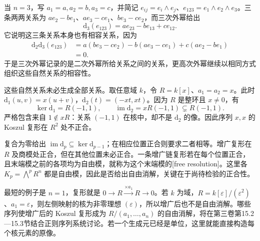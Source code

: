\ProseParagraphBreak
当 \(n=3\)，写 \(a_1=a,a_2=b,a_3=c\)，并简记 \(e_{ij}=e_i\wedge e_j\)、\(e_{123}=e_1\wedge e_2\wedge e_3\)。三条两两关系为 \(ae_2-be_1\)、\(ae_3-ce_1\)、\(be_3-ce_2\)，而三次外幂给出
\[
	\mathrm{d}_3(e_{123})=a e_{23}-b e_{13}+c e_{12}.
\]
它说明这三条关系本身也有相容关系，因为
\[
	\begin{aligned}
		\mathrm{d}_2\mathrm{d}_3(e_{123}) &=a(be_3-ce_2)-b(ae_3-ce_1)+c(ae_2-be_1)\\
		&=0.
	\end{aligned}
\]
于是三次外幂记录的是二次外幂所给关系之间的关系，更高次外幂继续以相同方式组织这些自然关系的相容性。

\ProseParagraphBreak
这些自然关系未必生成全部关系。取任意域 \(k\)，令 \(R=k[x]\)、\(a_1=a_2=x\)。此时 \(\mathrm{d}_1(u,v)=x(u+v)\)，\(\mathrm{d}_2(t)=(-xt,xt)\)。因为 \(R\) 是整环且 \(x\ne0\)，有
\[
	\ker\mathrm{d}_1=R(-1,1),\qquad \operatorname{im}\mathrm{d}_2=xR(-1,1)\subsetneq R(-1,1).
\]
严格包含来自 \(1\notin xR\)：关系 \((-1,1)\) 在核中，却不是 \(\mathrm{d}_2\) 的像。因此序列 \(x,x\) 的 Koszul 复形在 \(R^2\) 处不正合。

\ProseParagraphBreak
复合为零给出 \(\operatorname{im}\mathrm{d}_p\subseteq\ker\mathrm{d}_{p-1}\)；在相应位置正合则要求二者相等。增广复形在 \(R\) 及商模处正合，但在其他位置未必正合。一条增广链复形若在每个位置正合，且末端模之前的各项均为自由模，就称为这个末端模的[free resolution]。这里各 \(K_p=\bigwedge^pR^n\) 都是自由模，因此是否给出自由消解，关键在于尚待检验的正合性。

\ProseParagraphBreak
最短的例子是 \(n=1\)，复形就是 \(0\to R\xrightarrow{\times a_1}R\to0\)。若 \(k\) 为域，\(R=k[\varepsilon]/(\varepsilon^2)\)、\(a_1=\varepsilon\)，则左侧映射的核为非零理想 \((\varepsilon)\)，所以增广后也不是自由消解。哪些序列使增广后的 Koszul 复形成为 \(R/(a_1,\ldots,a_n)\) 的自由消解，将在第三卷第15.2—15.3节结合正则序列系统讨论。若一个生成元已经是单位，这里就能直接构造每个核元素的原像。

